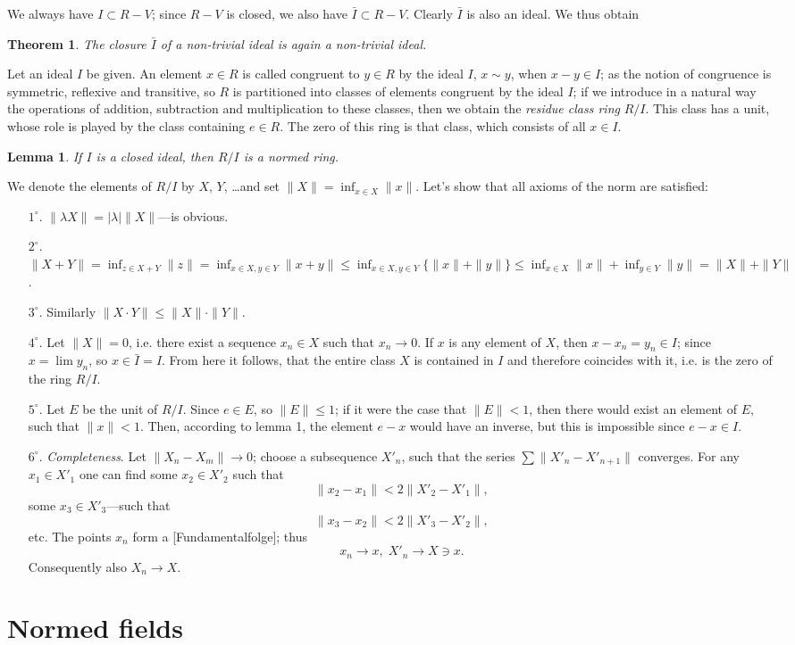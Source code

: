 \documentclass{article}
\newtheorem{theorem}{Theorem}
\newtheorem{lemma}{Lemma}
\theoremstyle{definition}
\begin{document}
We always have $I\subset R-V$; since $R-V$ is closed, we also have $\bar{I}\subset R-V$. Clearly $\bar{I}$ is also an ideal. We thus obtain
\begin{theorem}
  The closure $\bar{I}$ of a non-trivial ideal is again a non-trivial ideal.
\end{theorem}

Let an ideal $I$ be given. An element $x\in R$ is called congruent to $y\in R$ by the ideal $I$, $x\sim y$, when $x-y\in I$; as the notion of congruence is symmetric, reflexive and transitive, so $R$ is partitioned into classes of elements congruent by the ideal $I$; if we introduce in a natural way the operations of addition, subtraction and multiplication to these classes, then we obtain the \emph{residue class ring} $R/I$. This class has a unit, whose role is played by the class containing $e\in R$. The zero of this ring is that class, which consists of all $x\in I$.

\begin{lemma}
  If $I$ is a closed ideal, then $R/I$ is a normed ring.
\end{lemma}

We denote the elements of $R/I$ by $X$, $Y$, \dots and set $\|X\| = \inf_{x\in X} \|x\|$. Let's show that all axioms of the norm are satisfied:
\begin{enumerate}
\item [$1^\circ$.] $\|\lambda X\| = |\lambda| \|X\|$---is obvious.
\item [$2^\circ$.] $\|X+Y\| = \inf_{z\in X+Y} \|z\| = \inf_{x\in X, y\in Y} \|x + y\| \leq \inf_{x\in X, y\in Y} \{\|x\| + \|y\|\} \leq \inf_{x\in X} \|x\| + \inf_{y\in Y} \|y\| = \|X\| + \|Y\|$.
\item [$3^\circ$.] Similarly $\|X\cdot Y\| \leq \|X\|\cdot\|Y\|$.
\item [$4^\circ$.] Let $\|X\| = 0$, i.e. there exist a sequence $x_n\in X$ such that $x_n \to 0$. If $x$ is any element of $X$, then $x-x_n=y_n\in I$; since $x=\lim y_n$, so $x\in \bar{I}=I$. From here it follows, that the entire class $X$ is contained in $I$ and therefore coincides with it, i.e. is the zero of the ring $R/I$.
\item [$5^\circ$.] Let $E$ be the unit of $R/I$. Since $e\in E$, so $\|E\|\leq 1$; if it were the case that $\|E\|<1$, then there would exist an element of $E$, such that $\|x\|<1$. Then, according to lemma 1, the element $e-x$ would have an inverse, but this is impossible since $e-x\in I$.
\item [$6^\circ$.] \emph{Completeness}. Let $\|X_n-X_m\| \to 0$; choose a subsequence $X'_n$, such that the series $\sum\|X'_n-X'_{n+1}\|$ converges. For any $x_1\in X'_1$ one can find some $x_2\in X'_2$ such that
  $$ \|x_2-x_1\| < 2\|X'_2-X'_1\|, $$
  some $x_3\in X'_3$---such that
  $$ \|x_3-x_2\| < 2\|X'_3-X'_2\|, $$
  etc. The points $x_n$ form a [Fundamentalfolge]; thus
  $$ x_n \to x,\; X'_n\to X\ni x. $$
  Consequently also $X_n \to X$.
\end{enumerate}

\section{Normed fields}
\end{document}
